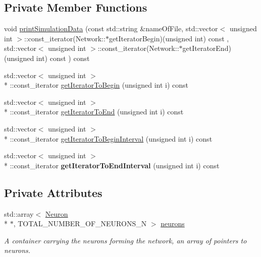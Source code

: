 \subsection*{Private Member Functions}
\begin{DoxyCompactItemize}
\item 
void \hyperlink{classNetwork_ad28d5206f20213eba2143222c566fb00}{print\-Simulation\-Data} (const std\-::string \&name\-Of\-File, std\-::vector$<$ unsigned int $>$\-::const\-\_\-iterator(Network\-::$\ast$get\-Iterator\-Begin)(unsigned int) const , std\-::vector$<$ unsigned int $>$\-::const\-\_\-iterator(Network\-::$\ast$get\-Iterator\-End)(unsigned int) const ) const 
\item 
std\-::vector$<$ unsigned int $>$\\*
\-::const\-\_\-iterator \hyperlink{classNetwork_a0423144b1411e885884410adb9ff10d4}{get\-Iterator\-To\-Begin} (unsigned int i) const 
\item 
std\-::vector$<$ unsigned int $>$\\*
\-::const\-\_\-iterator \hyperlink{classNetwork_a0289c82fc429d301c1f7b33881b6737d}{get\-Iterator\-To\-End} (unsigned int i) const 
\item 
std\-::vector$<$ unsigned int $>$\\*
\-::const\-\_\-iterator \hyperlink{classNetwork_af437eddac886ac6fced8078885a2cc0a}{get\-Iterator\-To\-Begin\-Interval} (unsigned int i) const 
\item 
\hypertarget{classNetwork_a009cca76442a5f847fd1e227b0427313}{std\-::vector$<$ unsigned int $>$\\*
\-::const\-\_\-iterator {\bfseries get\-Iterator\-To\-End\-Interval} (unsigned int i) const }\label{classNetwork_a009cca76442a5f847fd1e227b0427313}

\end{DoxyCompactItemize}
\subsection*{Private Attributes}
\begin{DoxyCompactItemize}
\item 
\hypertarget{classNetwork_a11dac461892218c2653fccdb761a99aa}{std\-::array$<$ \hyperlink{classNeuron}{Neuron} \\*
$\ast$, T\-O\-T\-A\-L\-\_\-\-N\-U\-M\-B\-E\-R\-\_\-\-O\-F\-\_\-\-N\-E\-U\-R\-O\-N\-S\-\_\-\-N $>$ \hyperlink{classNetwork_a11dac461892218c2653fccdb761a99aa}{neurons}}\label{classNetwork_a11dac461892218c2653fccdb761a99aa}

\begin{DoxyCompactList}\small\item\em A container carrying the neurons forming the network, an array of pointers to neurons. \end{DoxyCompactList}\end{DoxyCompactItemize}


